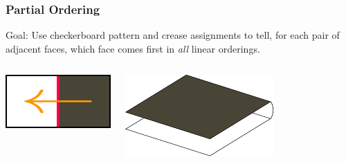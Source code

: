 \documentclass{beamer}
\begin{document}
\begin{frame}
\frametitle{Partial Ordering}
\begin{block}{Goal:}
Use checkerboard pattern and crease assignments to tell, for each pair of adjacent faces, which face comes first in \textit{all} linear orderings.
\end{block}

\bigskip

\begin{columns}[c]
\includegraphics[width=\textwidth]{sam_images/checkerboard-tile-V.pdf}

\includegraphics[width=.9\textwidth]{sam_images/checkerboard-3a.pdf}

\end{columns}

\end{frame}

\end{document}
